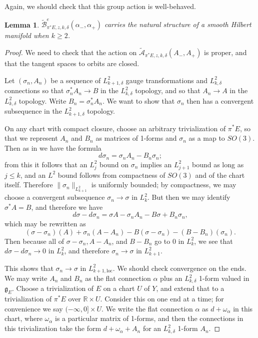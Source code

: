 \documentclass{memo-l}
\newcommand{\pE}{\pi^* \! E}
\newtheorem{lemma}[theorem]{Lemma}
\theoremstyle{definition}
\theoremstyle{remark}
\numberwithin{section}{chapter}
\numberwithin{equation}{chapter}
\begin{document}
Again, we should check that this group action is well-behaved.

\begin{lemma}$\widetilde{\mathcal B}^{e}_{\pE, z, k, \delta}(\alpha_-, \alpha_+)$ carries the natural structure of a smooth Hilbert manifold when $k \geq 2$. 
\end{lemma}
\begin{proof}
We need to check that the action on $\widetilde{\mathcal A}_{\pE,z,k,\delta}(A_-, A_+)$ is proper, and that the tangent spaces to orbits are closed. 

Let $(\sigma_n, A_n)$ be a sequence of $L^2_{k+1,\delta}$ gauge transformations and $L^2_{k,\delta}$ connections so that $\sigma_n^*A_n \to B$ in the $L^2_{k,\delta}$ topology, and so that $A_n \to A$ in the $L^2_{k,\delta}$ topology. Write $B_n = \sigma_n^* A_n$. We want to show that $\sigma_n$ then has a convergent subsequence in the $L^2_{k+1,\delta}$ topology.

On any chart with compact closure, choose an arbitrary trivialization of $\pE$, so that we represent $A_n$ and $B_n$ as matrices of 1-forms and $\sigma_n$ as a map to $SO(3)$. Then as in \cite[Section~2.3.7]{DK} we have the formula
$$d\sigma_n = \sigma_n A_n - B_n \sigma_n;$$ 
from this it follows that an $L^2_j$ bound on $\sigma_n$ implies an $L^2_{j+1}$ bound as long as $j \leq k$, and an $L^2$ bound follows from compactness of $SO(3)$ and of the chart itself. Therefore $\|\sigma_n\|_{L^2_{k+1}}$ is uniformly bounded; by compactness, we may choose a convergent subsequence $\sigma_n \to \sigma$ in $L^2_k$. But then we may identify $\sigma^*A = B$, and therefore we have $$d\sigma - d\sigma_n = \sigma A - \sigma_n A_n - B \sigma + B_n \sigma_n,$$ which may be rewritten as $$(\sigma - \sigma_n)(A) + \sigma_n(A-A_n) - B(\sigma - \sigma_n) - (B - B_n)(\sigma_n).$$ Then because all of $\sigma - \sigma_n, A - A_n$, and $B - B_n$  go to $0$ in $L^2_k$, we see that $d\sigma - d\sigma_n \to 0$ in $L^2_k$, and therefore $\sigma_n \to \sigma$ in $L^2_{k+1}$.

This shows that $\sigma_n \to \sigma$ in $L^2_{k+1,\text{loc}}$. We should check convergence on the ends. We may write $A_n$ and $B_n$ as the flat connection $\alpha$ plus an $L^2_{k,\delta}$ 1-form valued in $\mathfrak g_E$. Choose a trivialization of $E$ on a chart $U$ of $Y$, and extend that to a trivialization of $\pE$ over $\mathbb R \times U$. Consider this on one end at a time; for convenience we say $(-\infty, 0] \times U$. We write the flat connection $\alpha$ as $d + \omega_\alpha$ in this chart, where $\omega_\alpha$ is a particular matrix of 1-forms, and then the connections in this trivialization take the form $d + \omega_\alpha + A_n$ for an $L^2_{k,\delta}$ 1-form $A_n$.


\end{proof}
\end{document}
